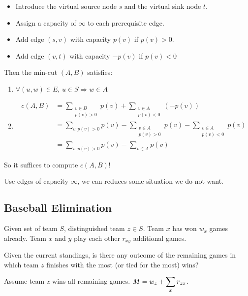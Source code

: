     \begin{itemize}
        \item Introduce the virtual source node  $ s $ and the virtual sink node  $ t $.
        \item Assign a capacity of  $ \infty $ to each prerequisite edge.
        \item Add edge  $ (s,v) $ with capacity  $ p(v) $ if  $ p(v)>0 $.
        \item Add edge  $ (v,t) $ with capacity  $ -p(v) $ if  $ p(v)<0 $ 
    \end{itemize}

    Then the min-cut $ (A,B)  $ satisfies:
    \begin{enumerate}[label=\arabic*)]
        \item  $ \forall (u,w)\in E  $,  $ u\in S\Rightarrow w\in A $ 
        \item \begin{align*}
            c(A,B)&=\sum_{\substack{v\in B\\p(v)>0}}p(v)+\sum_{\substack{v\in A\\p(v)<0}}(-p(v))\\
            &=\sum_{v:p(v)>0}p(v)-\sum_{\substack{v\in A\\p(v)>0}}p(v)-\sum_{\substack{v\in A\\p(v)<0}}p(v)\\
            &=\sum_{v:p(v)>0}p(v)-\sum_{v\in A}p(v)
        \end{align*}
    \end{enumerate}

    So it suffices to compute  $ c(A,B) $!

    \begin{remark}
        Use edges of capacity $ \infty $, we can reduces some situation we do not want.
    \end{remark}

    \subsection{Baseball Elimination}
    \begin{example}
        Given set of team  $ S $, distinguished team  $ z\in S $. Team  $ x  $ has won  $ w_x  $ games already. Team  $ x  $ and  $ y  $ play each other  $ r_{xy} $  additional games.

        Given the current standings, is there any outcome of the remaining games in which team  $ z $ finishes with the most (or tied for the most) wins?
    \end{example}
    Assume team  $ z  $ wins all remaining games.  $ M=w_z+\displaystyle\sum_{x}r_{zx} $.

